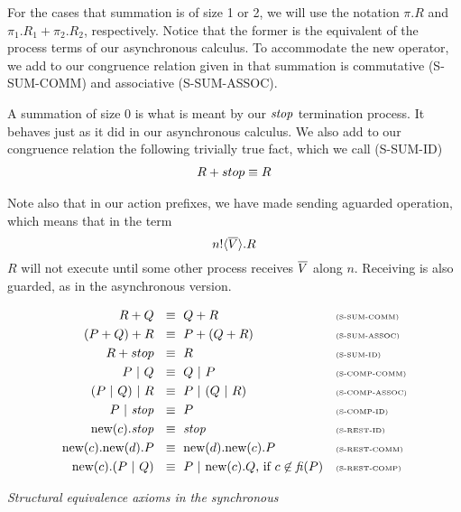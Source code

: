 For the cases that summation is of size 1 or 2, we will use the notation $\pi.R$ and $\pi_1.R_1 + \pi_2.R_2$, respectively.  Notice that the former is the equivalent of the process terms of our asynchronous calculus.
To accommodate the new operator, we add to our congruence relation given in  that summation is commutative (S-SUM-COMM) and associative (S-SUM-ASSOC).

A summation of size 0 is what is meant by our $\mbox{\emph{stop}}$ termination process.  
It behaves just as it did in our asynchronous calculus.
We also add to our congruence relation the following trivially true fact, which we call (S-SUM-ID)
\begin{align*}
	R + stop \equiv R
\end{align*}

Note also that in our action prefixes, we have made sending aguarded operation, which means that in the term
\[
	{n}!\langle{ \ensuremath{\overline{V}} }\rangle.R
\]
$R$ will not execute until some other process receives $\overline{V}$ along $n$.  
Receiving is also guarded, as in the asynchronous version.  

\begin{insettable_wide}
\begin{center}
	\begin{align*}
		R + Q\ &\   \equiv\ Q + R && \text{\tiny{(S-SUM-COMM)}}\\
		(P + Q) + R\ &\   \equiv\ P + (Q + R) && \text{\tiny{(S-SUM-ASSOC)}}\\
		R + stop\ &\   \equiv\ R && \text{\tiny{(S-SUM-ID)}}\\
		P \ |\  Q\ &\  \equiv\  Q \ |\  P && \text{\tiny{(S-COMP-COMM)}}\\
	 	(P \ |\  Q) \ |\  R\ &\ \equiv\ P \ |\  (Q \ |\  R) && \text{\tiny{(S-COMP-ASSOC)}}\\
		P \ |\  \mbox{\emph{stop}}\ &\ \equiv\ P && \text{\tiny{(S-COMP-ID)}}\\
		\text{new}({c}). \mbox{\emph{stop}}\ &\ \equiv\ \mbox{\emph{stop}} && \text{\tiny{(S-REST-ID)}}\\
		\text{new}({c}).\text{new}({d}). P \ &\ \equiv\ \text{new}({d}).\text{new}({c}). P && \text{\tiny{(S-REST-COMM)}}\\
		\text{new}({c}).(P \ |\  Q)\ &\ \equiv\  P \ |\  \text{new}({c}).Q\text{, if } c\not\in \mbox{\emph{fi}}(P) && \text{\tiny{(S-REST-COMP)}}
	\end{align*}
	\caption{\emph{Structural equivalence axioms in the synchronous \picalc}}\label{spicalcaxioms}
\end{center}\end{insettable_wide}

